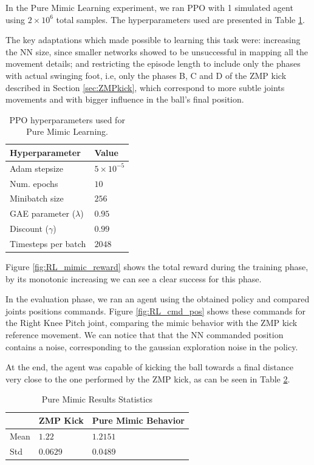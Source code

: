In the Pure Mimic Learning experiment, we ran PPO with 1 simulated agent using  $2 \times 10^6$ total samples. The hyperparameters used are presented in Table \ref{tab:ppo_pure_mimic}.

The key adaptations which made possible to learning this task were: increasing the NN size, since smaller networks showed to be unsuccessful in mapping all the movement details; and restricting the episode length to include only the phases with actual swinging foot, i.e, only the phases B, C and D of the ZMP kick described in Section \ref{sec:ZMPkick}, which correspond to more subtle joints movements and with bigger influence in the ball's final position.

\begin{table}[ht]
    \begin{tabular}{|l|l|}
    \hline
    Hyperparameter            & Value    \\ \hline
    Adam stepsize             & $5 \times 10^{-5}$ \\
    Num. epochs               & $10$     \\
    Minibatch size            & $256$     \\
    GAE parameter ($\lambda$) & $0.95$   \\
    Discount ($\gamma$)		   & $0.99$	  \\
    Timesteps per batch       & $2048$   \\ \hline
    \end{tabular}
\centering
\caption{PPO hyperparameters used for Pure Mimic Learning.}
\label{tab:ppo_pure_mimic}
\end{table}

Figure \ref{fig:RL_mimic_reward} shows the total reward during the training phase, by its monotonic increasing we can see a clear success for this phase.

In the evaluation phase, we ran an agent using the obtained policy and compared joints positions commands. Figure \ref{fig:RL_cmd_pos} shows these commands for the Right Knee Pitch joint, comparing the mimic behavior with the ZMP kick reference movement. We can notice that that the NN commanded position contains a noise, corresponding to the gaussian exploration noise in the policy.

At the end, the agent was capable of kicking the ball towards a final distance very close to the one performed by the ZMP kick, as can be seen in Table \ref{tab:ppo_pure_mimic_stat}.

\begin{table}[ht]
    \begin{tabular}{|l|l|l|}
    \hline
      &     ZMP Kick          & Pure Mimic Behavior  \\ \hline
    Mean             &    $1.22$       &   $1.2151$       \\
    Std              &    $0.0629$     &   $0.0489$       \\ \hline
    \end{tabular}
\centering
\caption{Pure Mimic Results Statistics}
\label{tab:ppo_pure_mimic_stat}
\end{table}


